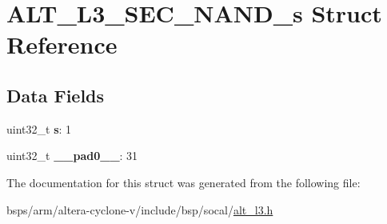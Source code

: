 \hypertarget{structALT__L3__SEC__NAND__s}{}\section{A\+L\+T\+\_\+\+L3\+\_\+\+S\+E\+C\+\_\+\+N\+A\+N\+D\+\_\+s Struct Reference}
\label{structALT__L3__SEC__NAND__s}
\subsection*{Data Fields}
\begin{DoxyCompactItemize}
\item 
\mbox{\label{structALT__L3__SEC__NAND__s_a1b4bb33d74336d85dc9363c140147fe9}} 
uint32\+\_\+t {\bfseries s}\+: 1
\item 
\mbox{\label{structALT__L3__SEC__NAND__s_a54081c5d6ef588aca590ce6d9e49ec48}} 
uint32\+\_\+t {\bfseries \+\_\+\+\_\+pad0\+\_\+\+\_\+}\+: 31
\end{DoxyCompactItemize}


The documentation for this struct was generated from the following file\+:\begin{DoxyCompactItemize}
\item 
bsps/arm/altera-\/cyclone-\/v/include/bsp/socal/\mbox{\hyperlink{alt__l3_8h}{alt\+\_\+l3.\+h}}\end{DoxyCompactItemize}
